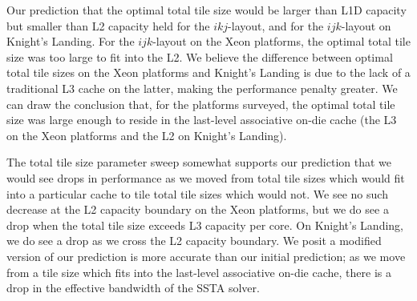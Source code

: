 \documentclass{sig-alternate-05-2015}
\begin{document}
Our prediction that the optimal total tile size would be larger than L1D
  capacity but smaller than L2 capacity held for the \(ikj\)-layout, and for 
  the \(ijk\)-layout on Knight's Landing.
For the \(ijk\)-layout on the Xeon platforms, the optimal total tile size was
  too large to fit into the L2.
We believe the difference between optimal total tile sizes on the Xeon
  platforms and Knight's Landing is due to the lack of a traditional L3 cache on
  the latter, making the performance penalty greater.
We can draw the conclusion that, for the platforms surveyed, the optimal total
  tile size was large enough to reside in the last-level associative on-die cache
  (the L3 on the Xeon platforms and the L2 on Knight's Landing).

The total tile size parameter sweep somewhat supports our prediction that we
  would see drops in performance as we moved from total tile sizes which would
  fit into a particular cache to tile total tile sizes which would not.
We see no such decrease at the L2 capacity boundary on the Xeon platforms, but
  we do see a drop when the total tile size exceeds L3 capacity per core.
On Knight's Landing, we do see a drop as we cross the L2 capacity boundary.
We posit a modified version of our prediction is more accurate than our initial
  prediction; as we move from a tile size which fits into the last-level
  associative on-die cache, there is a drop in the effective bandwidth of the
  SSTA solver.

\end{document}
